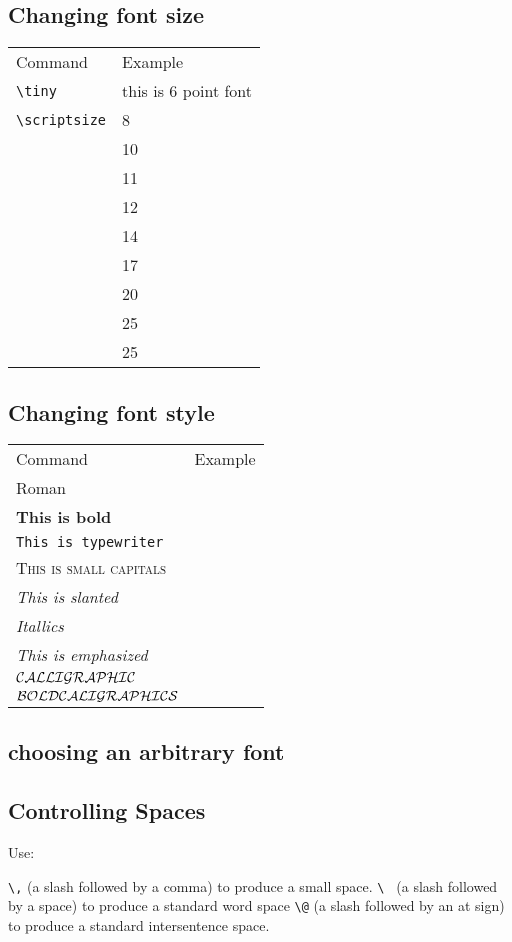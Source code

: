 \begin{enumerate}
\subsection{Changing font size}
\begin{tabular}{ll}
Command & Example\\
\verb+\tiny+ & {\tiny this is 6 point font} \\
\verb+\scriptsize+ & 8\\
\footnotesize & 10\\
\small & 11\\
\normalsize & 12\\
\large & 14\\
\Large & 17\\
\LARGE & 20\\
\huge & 25\\
\Huge & 25\\
\end{tabular}

\subsection{Changing font style}
\begin{tabular}{ll}
Command & Example\\
{\rm Roman} \\
\textbf{This is bold}\\
\texttt{This is typewriter}\\
\textsc{This is small capitals}\\
\textsl{This is slanted}\\
\textit{Itallics}\\
\emph{This is emphasized}\\
$\cal CALLIGRAPHIC$\\
{\boldmath $\cal BOLD CALIGRAPHICS$}\\
\end{tabular}

\subsection{choosing an arbitrary font}

\subsection{Controlling Spaces}

Use:

 \verb+\,+ (a slash followed by a comma) to produce a small space.
 \verb+\ + (a slash followed by a space) to produce a standard word  space
 \verb+\@+ (a slash followed by an at sign) to produce a standard
 intersentence space.





\end{enumerate}
